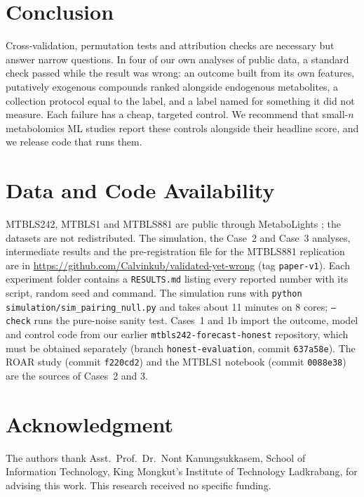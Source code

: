 \documentclass[conference]{IEEEtran}
\begin{document}
\section{Conclusion}
\label{sec:conclusion}
Cross-validation, permutation tests and attribution checks are necessary but
answer narrow questions. In four of our own analyses of public data, a
standard check passed while the result was wrong: an outcome built from its
own features, putatively exogenous compounds ranked alongside endogenous
metabolites, a collection protocol equal to the label, and a label named for
something it did not measure. Each failure has a cheap, targeted control. We
recommend that small-$n$ metabolomics ML studies report these controls
alongside their headline score, and we release code that runs them.

\section*{Data and Code Availability}
MTBLS242, MTBLS1 and MTBLS881 are public through MetaboLights \cite{haug2020};
the datasets are not redistributed. The simulation, the Case~2 and Case~3
analyses, intermediate results and the pre-registration file for the MTBLS881
replication are in \url{https://github.com/Calvinkub/validated-yet-wrong}
(tag \texttt{paper-v1}). Each experiment folder contains a \texttt{RESULTS.md}
listing every reported number with its script, random seed and command. The
simulation runs with \texttt{python simulation/sim\_pairing\_null.py} and
takes about 11 minutes on 8 cores; \texttt{--check} runs the pure-noise
sanity test. Cases~1 and 1b import the outcome, model and control code from
our earlier \texttt{mtbls242-forecast-honest} repository, which must be
obtained separately \cite{repo_forecast} (branch
\texttt{honest-evaluation}, commit \texttt{637a58e}). The ROAR study
\cite{repo_roar} (commit \texttt{f220cd2}) and the MTBLS1 notebook
\cite{repo_bridge} (commit \texttt{0088e38}) are the sources of Cases~2
and 3.

\section*{Acknowledgment}
The authors thank Asst.\ Prof.\ Dr.\ Nont Kanungsukkasem, School of
Information Technology, King Mongkut's Institute of Technology Ladkrabang, for
advising this work. This research received no specific funding.
\end{document}
